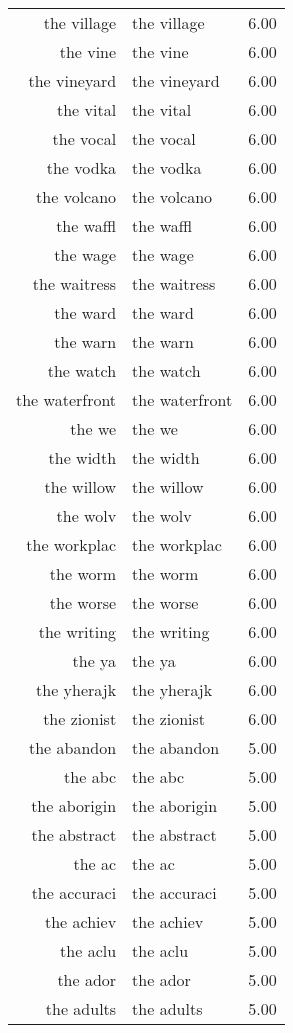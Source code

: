 \begin{table}[ht]
\begin{tabular}{rlr}
  the village & the village & 6.00 \\ 
  the vine & the vine & 6.00 \\ 
  the vineyard & the vineyard & 6.00 \\ 
  the vital & the vital & 6.00 \\ 
  the vocal & the vocal & 6.00 \\ 
  the vodka & the vodka & 6.00 \\ 
  the volcano & the volcano & 6.00 \\ 
  the waffl & the waffl & 6.00 \\ 
  the wage & the wage & 6.00 \\ 
  the waitress & the waitress & 6.00 \\ 
  the ward & the ward & 6.00 \\ 
  the warn & the warn & 6.00 \\ 
  the watch & the watch & 6.00 \\ 
  the waterfront & the waterfront & 6.00 \\ 
  the we & the we & 6.00 \\ 
  the width & the width & 6.00 \\ 
  the willow & the willow & 6.00 \\ 
  the wolv & the wolv & 6.00 \\ 
  the workplac & the workplac & 6.00 \\ 
  the worm & the worm & 6.00 \\ 
  the worse & the worse & 6.00 \\ 
  the writing & the writing & 6.00 \\ 
  the ya & the ya & 6.00 \\ 
  the yherajk & the yherajk & 6.00 \\ 
  the zionist & the zionist & 6.00 \\ 
  the abandon & the abandon & 5.00 \\ 
  the abc & the abc & 5.00 \\ 
  the aborigin & the aborigin & 5.00 \\ 
  the abstract & the abstract & 5.00 \\ 
  the ac & the ac & 5.00 \\ 
  the accuraci & the accuraci & 5.00 \\ 
  the achiev & the achiev & 5.00 \\ 
  the aclu & the aclu & 5.00 \\ 
  the ador & the ador & 5.00 \\ 
  the adults & the adults & 5.00 \\ 

\end{tabular}
\end{table}
